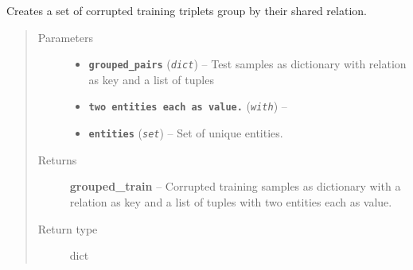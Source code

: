 \documentclass[letterpaper,10pt,english]{sphinxmanual}
\begin{document}

\begin{fulllineitems}
\label{src.trans_e:src.trans_e.trans_we.create_corrupt_triples}
Creates a set of corrupted training triplets group by their shared relation.
\begin{quote}\begin{description}
\item[{Parameters}] \leavevmode\begin{itemize}
\item {} 
\textbf{\texttt{grouped\_pairs}} (\emph{\texttt{dict}}) -- Test samples as dictionary with relation as key and a list of tuples

\item {} 
\textbf{\texttt{two entities each as value.}} (\emph{\texttt{with}}) -- 

\item {} 
\textbf{\texttt{entities}} (\emph{\texttt{set}}) -- Set of unique entities.

\end{itemize}

\item[{Returns}] \leavevmode
\textbf{grouped\_train} -- Corrupted training samples as dictionary with a relation as key and a list of tuples
with two entities each as value.

\item[{Return type}] \leavevmode
dict

\end{description}\end{quote}

\end{fulllineitems}

\end{document}
